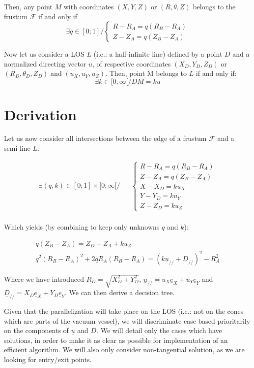 \documentclass[a4paper,11pt,twoside,titlepage,openright]{book}
\numberwithin{equation}{section}
\newcommand{\ud}[1]{\underline{#1}}
\begin{document}
Then, any point $M$ with coordinates $(X,Y,Z)$ or $(R,\theta,Z)$ belongs to the frustum $\mathcal{F}$ if and only if
$$
\exists q \in [0;1] / 
\left\{ \begin{array}{ll}
R-R_A = q(R_B-R_A)\\
Z-Z_A = q(Z_B-Z_A)
\end{array}\right.
$$


Now let us consider a LOS $L$ (i.e.: a half-infinite line) defined by a point $D$ and a normalized directing vector $u$, of respective coordinates $(X_D,Y_D,Z_D)$ or $(R_D,\theta_D,Z_D)$ and $(u_X,u_Y,u_Z)$.
Then, point M belongs to $L$ if and only if:
$$
\exists k \in [0;\infty[ / \ud{DM} = k\ud{u}
$$


\chapter{Derivation}

Let us now consider all intersections between the edge of a frustum $\mathcal{F}$ and a semi-line $L$.

\begin{equation}
\begin{array}{lll}
\exists (q,k) \in [0;1]\times [0;\infty[ /& & 
\left\{\begin{array}{ll}
R-R_A = q(R_B-R_A)\\
Z-Z_A = q(Z_B-Z_A)\\
X-X_D = ku_X\\
Y-Y_D = ku_Y\\
Z-Z_D = ku_Z
\end{array}\right.\\
\end{array}
\label{eqn:201}
\end{equation}

Which yields (by combining to keep only unknowns $q$ and $k$):

\begin{equation}
\begin{array}{cc}
q(Z_B-Z_A) = Z_D-Z_A + ku_Z\\
q^2(R_B-R_A)^2 + 2qR_A(R_B-R_A) = \left(k\ud{u}_{//} + \ud{D}_{//}\right)^2 - R_A^2
\end{array}
\end{equation}

Where we have introduced $R_D = \sqrt{X_D^2+Y_D^2}$, $\ud{u}_{//} = u_X\ud{e}_X+u_Y\ud{e}_Y$ and $\ud{D}_{//} = X_D\ud{e}_X + Y_D\ud{e}_Y$.
We can then derive a decision tree.


Given that the parallelization will take place on the LOS (i.e.: not on the cones which are parts of the vacuum vessel), we will discriminate case based prioritarily on the components of $\ud{u}$ and $D$.
We will detail only the cases which have solutions, in order to make it as clear as possible for implementation of an efficient algorithm.
We will also only consider non-tangential solution, as we are looking for entry/exit points.
\end{document}
